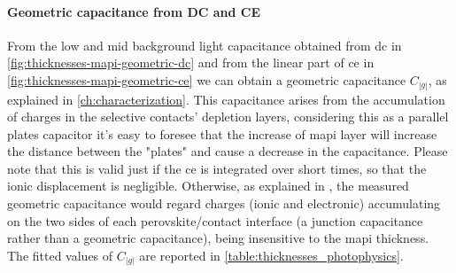 	\paragraph{Geometric capacitance from DC and CE}
	From the low and mid background light capacitance obtained from \gls{dc} in \cref{fig:thicknesses-mapi-geometric-dc} and from the linear part of \gls{ce} in \cref{fig:thicknesses-mapi-geometric-ce} we can obtain a geometric capacitance $C_|g|$, as explained in \cref{ch:characterization}.
	This capacitance arises from the accumulation of charges in the selective contacts' depletion layers, considering this as a parallel plates capacitor it's easy to foresee that the increase of \gls{mapi} layer will increase the distance between the "plates" and cause a decrease in the capacitance.
	Please note that this is valid just if the \gls{ce} is integrated over short times, so that the ionic displacement is negligible.
	Otherwise, as explained in , the measured geometric capacitance would regard charges (ionic and electronic) accumulating on the two sides of each perovskite\-/contact interface (a junction capacitance rather than a geometric capacitance), being insensitive to the \gls{mapi} thickness.
	The fitted values of $C_|g|$ are reported in \cref{table:thicknesses_photophysics}.

	\begin{figure}
	\end{figure}

